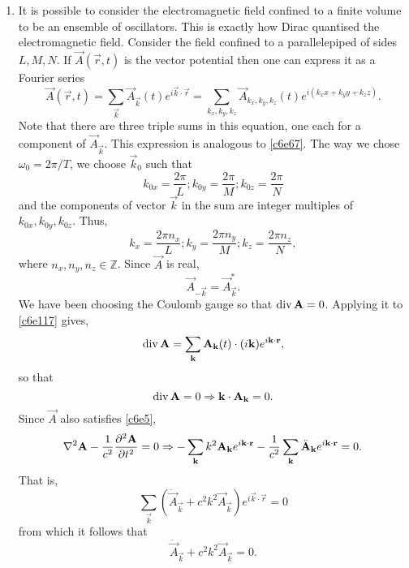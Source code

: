 \begin{enumerate}
\item It is possible to consider the electromagnetic field confined to a finite
volume to be an ensemble of oscillators. This is exactly how Dirac quantised the
electromagnetic field. Consider the field confined to a parallelepiped of sides
$L, M, N$. If $\vec{A}(\vec{r}, t)$ is the vector potential then one can express it
as a Fourier series
\begin{equation}\label{c6e117}
\vec{A}(\vec{r}, t) = \sum_{\vec{k}}\vec{A}_\vec{k}(t) e^{i\vec{k}\cdot\vec{r}} =
\sum_{k_x, k_y, k_z}\vec{A}_{k_x,k_y,k_z}(t) e^{i(k_xx + k_yy + k_zz)}.
\end{equation}
Note that there are three triple sums in this equation, one each for a component
of $\vec{A}_\vec{k}$. This expression is analogous to \eqref{c6e67}. The way we 
chose $\omega_0 = 2\pi/T$, we choose $\vec{k}_0$ such that
\begin{equation}\label{c6e118}
k_{0x} = \frac{2\pi}{L}; k_{0y} = \frac{2\pi}{M}; k_{0z} = \frac{2\pi}{N}
\end{equation}
and the components of vector $\vec{k}$ in the sum are integer multiples of 
$k_{0x}, k_{0y}, k_{0z}$. Thus,
\begin{equation}\label{c6e119}
k_{x} = \frac{2\pi n_x}{L}; k_{y} = \frac{2\pi n_y}{M}; k_{z} = \frac{2\pi n_z}{N},
\end{equation}
where $n_x, n_y, n_z \in \mathbb{Z}$. Since $\vec{A}$ is real,
\begin{equation}\label{c6e120}
\vec{A}_{-\vec{k}} = \vec{A}^\ast_{\vec{k}}.
\end{equation}
We have been choosing the Coulomb gauge so that $\operatorname{div}\mathbf{A} = 0$. Applying it
to \eqref{c6e117} gives,
\[
\operatorname{div}\mathbf{A} = \sum_\mathbf{k}\mathbf{A}_\mathbf{k}(t)\cdot(i\mathbf{k})e^{i\mathbf{k}\cdot\mathbf{r}},
\]
so that
\begin{equation}\label{c6e121}
\operatorname{div}\mathbf{A} = 0 \Rightarrow \mathbf{k}\cdot\mathbf{A}_\mathbf{k} = 0.
\end{equation}
Since $\vec{A}$ also satisfies \eqref{c6e5},
\[
\nabla^2\mathbf{A} - \frac{1}{c^2}\frac{\partial^2{\mathbf{A}}}{\partial{t}^2} = 0 \Rightarrow
-\sum_\mathbf{k}k^2\mathbf{A}_\mathbf{k}e^{i\mathbf{k}\cdot\mathbf{r}} - 
\frac{1}{c^2}\sum_\mathbf{k}\ddot{\mathbf{A}}_\mathbf{k}e^{i\mathbf{k}\cdot\mathbf{r}} = 0.
\]
That is,
\[
\sum_\vec{k}\left(\ddot{\vec{A}}_\vec{k} + c^2k^2\vec{A}_\vec{k}\right)e^{i\vec{k}\cdot\vec{r}} = 0
\]
from which it follows that
\begin{equation}\label{c6e122}
\ddot{\vec{A}}_\vec{k} + c^2k^2\vec{A}_\vec{k} = 0.
\end{equation}

\end{enumerate}
